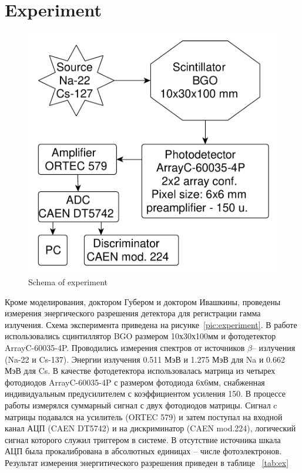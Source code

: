\documentclass[a4paper]{panl}
\begin{document}
\section*{Experiment}
\begin{figure} 
    \includegraphics[width=\linewidth]{figures/yed.pdf}  
    \vspace{-3mm}
    \caption{Schema of experiment}
    \vspace{-5mm}
\end{figure}
Кроме моделирования, доктором Губером и доктором Ивашкины, проведены измерения энергического разрешения детектора  для регистрации гамма излучения. Схема эксперимента приведена на рисунке~\ref{pic:experiment}. В работе использовались сцинтиллятор BGO размером 10х30х100мм и фотодетектор ArrayC-60035-4P. Проводились измерения спектров от источников $\beta$– излучения (Na-22 и Cs-137). Энергии излучения 0.511 МэВ и 1.275 МэВ для Na и 0.662 МэВ для Cs. В качестве фотодетектора использовалась матрица из четырех фотодиодов ArrayC-60035-4P с размером фотодиода 6х6мм, снабженная индивидуальным предусилителем с коэффициентом усиления 150. В процессе работы измерялся суммарный сигнал с двух фотодиодов матрицы. Сигнал c матрицы подавался на усилитель (ORTEC 579) и затем поступал на входной канал АЦП (CAEN DT5742) и на дискриминатор (CAEN mod.224), логический сигнал которого служил триггером в системе. В отсутствие источника шкала АЦП была прокалибрована в абсолютных единицах – числе фотоэлектронов. Результат измерения энергитического разрешения приведен в таблице ~\ref{tab:ex}
\end{document}
